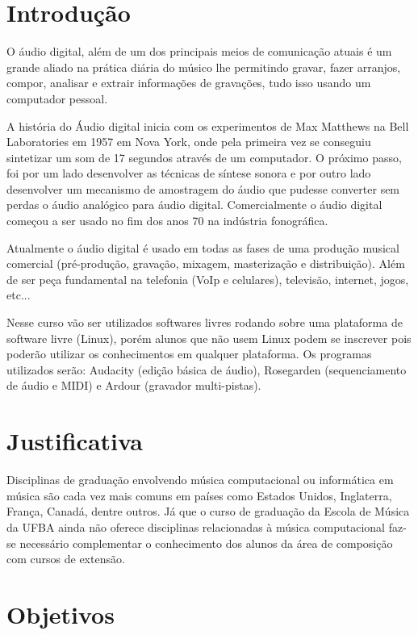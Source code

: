 \documentclass{article}
\begin{document}
\section{Introdução}


 O áudio digital, além de um dos principais meios de comunicação atuais é um grande aliado na prática diária do músico lhe permitindo gravar, fazer arranjos, compor, analisar e extrair informações de gravações, tudo isso usando um computador pessoal.


        A história do Áudio digital inicia com os experimentos de Max Matthews na Bell Laboratories em 1957 em Nova York, onde pela primeira vez se conseguiu sintetizar um som de 17 segundos através de um computador. O próximo passo, foi por um lado desenvolver as técnicas de síntese sonora e por outro lado desenvolver um mecanismo de amostragem do áudio que pudesse converter sem perdas o áudio analógico para áudio digital. Comercialmente o áudio digital começou a ser usado no fim dos anos 70 na indústria fonográfica. 


        Atualmente o áudio digital é usado em todas as fases de uma produção musical comercial (pré-produção, gravação, mixagem, masterização e distribuição). Além de ser peça fundamental na telefonia (VoIp e celulares), televisão, internet, jogos, etc...	        



        Nesse curso vão ser utilizados softwares livres rodando sobre uma plataforma de software livre (Linux), porém alunos que não usem Linux podem se inscrever pois poderão utilizar os conhecimentos em qualquer plataforma.
       Os programas utilizados serão: Audacity (edição básica de áudio), Rosegarden (sequenciamento de áudio e MIDI) e Ardour (gravador multi-pistas).

\section{Justificativa}
\label{sec:justificativa}
           Disciplinas de graduação envolvendo música computacional ou informática em
música são cada vez mais comuns em países como Estados Unidos, Inglaterra, França,
Canadá, dentre outros. Já que o curso de graduação da Escola de Música da UFBA ainda
não oferece disciplinas relacionadas à música computacional faz-se necessário
complementar o conhecimento dos alunos da área de composição com cursos de extensão.

		
\section {Objetivos}
\end{document}
